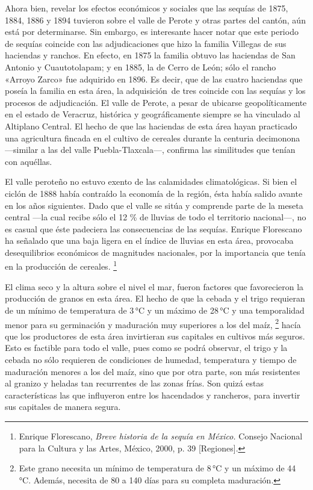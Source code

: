 \documentclass[14pt,twoside,final]{extbook} %
\let\oldfootnote\footnote
\renewcommand\footnote[1]{%
\oldfootnote{\hspace{1mm}#1}}
\begin{document}
Ahora bien, revelar los efectos económicos y sociales que las sequías de 1875, 1884, 1886 y 1894 tuvieron sobre el valle de Perote y otras partes del cantón, aún está por determinarse. Sin embargo, es interesante hacer notar que este periodo de sequías coincide con las adjudicaciones que hizo la familia Villegas de sus haciendas y ranchos. En efecto, en 1875 la familia obtuvo las haciendas de San Antonio y Cuautotolapam; y en 1885, la de Cerro de León; sólo el rancho «Arroyo Zarco» fue adquirido en 1896. Es decir, que de las cuatro haciendas que poseía la familia en esta área, la adquisición~de tres coincide con las sequías y los procesos de adjudicación. El valle de Perote, a pesar de ubicarse geopolíticamente en el estado de Veracruz, histórica y geográficamente siempre se ha vinculado al Altiplano Central. El hecho de que las haciendas de esta área hayan practicado una agricultura fincada en el cultivo de cereales durante la centuria decimonona ---similar a las del valle Puebla-Tlaxcala---, confirma las similitudes que tenían con aquéllas. \protect\enlargethispage*{\baselineskip}

El valle peroteño no estuvo exento de las calamidades climatológicas. Si bien el ciclón de 1888 había contraído la economía de la región, ésta había salido avante en los años siguientes. Dado que el valle se sitúa y comprende parte de la meseta central ---la cual recibe sólo el 12 \% de lluvias de todo el territorio nacional---, no es casual que éste padeciera las consecuencias de las sequías. Enrique Florescano ha señalado que una baja ligera en el índice de lluvias en esta área, provocaba desequilibrios económicos de magnitudes nacionales, por la importancia que tenía en la producción de cereales.\footnote{Enrique Florescano, \emph{Breve historia de la sequía en México.} Consejo Nacional para la Cultura y las Artes, México, 2000, p. 39 [Regiones].}

El clima seco y la altura sobre el nivel el mar, fueron factores que favorecieron la producción de granos en esta área. El hecho de que la cebada y el trigo requieran de un mínimo de temperatura de 3\,°C y un máximo de 28\,°C y una temporalidad menor para su germinación y maduración muy superiores a los del maíz,\footnote{Este grano necesita un mínimo de temperatura de 8\,°C y un máximo de 44\,°C. Además, necesita de 80 a 140 días para su completa maduración.} hacía que los productores de esta área invirtieran sus capitales en cultivos más seguros. Esto es factible para todo el valle, pues como se podrá observar, el trigo y la cebada no sólo requieren de condiciones de humedad, temperatura y tiempo de maduración menores a los del maíz, sino que por otra parte, son más resistentes al granizo y heladas tan recurrentes de las zonas frías. Son quizá estas características las que influyeron entre los hacendados y rancheros, para invertir sus capitales de manera segura.
\end{document}
